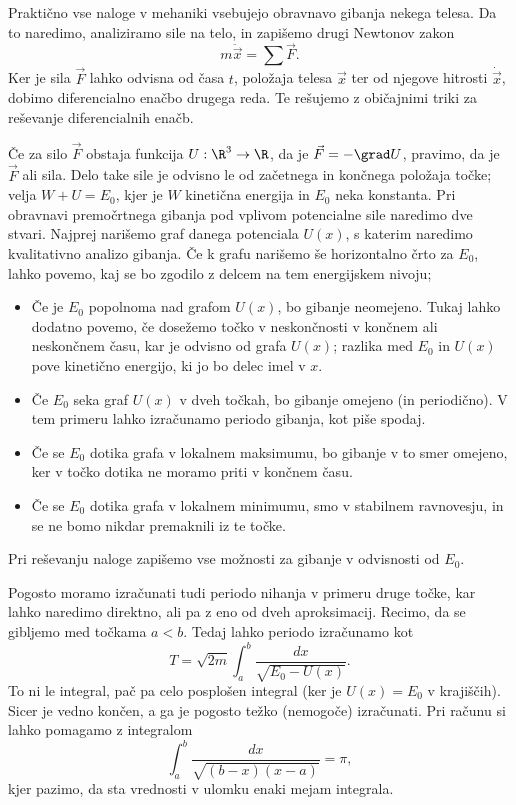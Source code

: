 
Praktično vse naloge v mehaniki vsebujejo obravnavo gibanja nekega telesa.
Da to naredimo, analiziramo sile na telo, in zapišemo drugi Newtonov zakon
\[
  m \ddot{\vec{x}} = \sum \vec{F}.
\]
Ker je sila $\vec{F}$ lahko odvisna od časa $t$, položaja telesa $\vec{x}$ ter
od njegove hitrosti $\dot{\vec{x}}$, dobimo diferencialno enačbo drugega reda.
Te rešujemo z običajnimi triki za reševanje diferencialnih enačb.

Če za silo $\vec{F}$ obstaja funkcija $U: \R^3 \to \R$, da je $\vec{F} = - \grad
U$, pravimo, da je $\vec{F}$  ali  sila.
Delo take sile je odvisno le od začetnega in končnega položaja točke; velja
$W + U = E_0$, kjer je $W$ kinetična energija in $E_0$ neka konstanta.
Pri obravnavi premočrtnega gibanja pod vplivom potencialne sile naredimo dve
stvari.
Najprej narišemo graf danega potenciala $U(x)$, s katerim naredimo kvalitativno
analizo gibanja.
Če k grafu narišemo še horizontalno črto za $E_0$, lahko povemo, kaj se bo
zgodilo z delcem na tem energijskem nivoju;
\begin{itemize}
\item Če je $E_0$ popolnoma nad grafom $U(x)$, bo gibanje neomejeno.
  Tukaj lahko dodatno povemo, če dosežemo točko v neskončnosti v končnem ali
  neskončnem času, kar je odvisno od grafa $U(x)$; razlika med $E_0$ in $U(x)$
  pove kinetično energijo, ki jo bo delec imel v $x$.
\item Če $E_0$ seka graf $U(x)$ v dveh točkah, bo gibanje omejeno (in
  periodično).
  V tem primeru lahko izračunamo periodo gibanja, kot piše spodaj.
\item Če se $E_0$ dotika grafa v lokalnem maksimumu, bo gibanje v to smer
  omejeno, ker v točko dotika ne moramo priti v končnem času.
\item Če se $E_0$ dotika grafa v lokalnem minimumu, smo v stabilnem ravnovesju,
  in se ne bomo nikdar premaknili iz te točke.
\end{itemize}
Pri reševanju naloge zapišemo vse možnosti za gibanje v odvisnosti od $E_0$.

Pogosto moramo izračunati tudi periodo nihanja v primeru druge točke, kar lahko
naredimo direktno, ali pa z eno od dveh aproksimacij.
Recimo, da se gibljemo med točkama $a < b$.
Tedaj lahko periodo izračunamo kot
\[
  T = \sqrt{2m} \int_a^b \frac{dx}{\sqrt{E_0 - U(x)}}.
\]
To ni le integral, pač pa celo posplošen integral (ker je $U(x) = E_0$ v
krajiščih).
Sicer je vedno končen, a ga je pogosto težko (nemogoče) izračunati.
Pri računu si lahko pomagamo z integralom
\[
  \int_a^b \frac{dx}{\sqrt{(b-x)(x-a)}} = \pi,
\]
kjer pazimo, da sta vrednosti v ulomku enaki mejam integrala.

